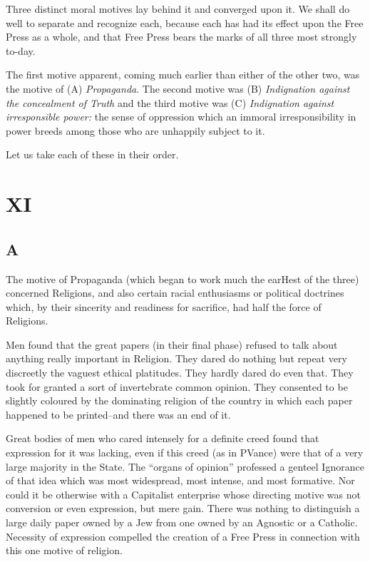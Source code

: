 \documentclass{book}
\begin{document}
Three distinct moral motives lay behind it and converged upon it. We shall do well to separate and recognize each, because each has had its effect upon the Free Press as a whole, and that Free Press bears the marks of all three most strongly to-day.

The first motive apparent, coming much earlier than either of the other two, was the motive of (A) \emph{Propaganda}. The second motive was (B) \emph{Indignation against the concealment of Truth} and the third motive was (C) \emph{Indignation against irresponsible power:} the sense of oppression which an immoral irresponsibility in power breeds among those who are unhappily subject to it.

Let us take each of these in their order.

\chapter*{XI}
\label{chapter-12}
\section*{A}
The motive of Propaganda (which began to work much the earHest of the three) concerned Religions, and also certain racial enthusiasms or political doctrines which, by their sincerity and readiness for sacrifice, had half the force of Religions.

Men found that the great papers (in their final phase) refused to talk about anything really important in Religion. They dared do nothing but repeat very discreetly the vaguest ethical platitudes. They hardly dared do even that. They took for granted a sort of invertebrate common opinion. They consented to be slightly coloured by the dominating religion of the country in which each paper happened to be printed–and there was an end of it.

Great bodies of men who cared intensely for a definite creed found that expression for it was lacking, even if this creed (as in PVance) were that of a very large majority in the State. The “organs of opinion” professed a genteel Ignorance of that idea which was most widespread, most intense, and most formative. Nor could it be otherwise with a Capitalist enterprise whose directing motive was not conversion or even expression, but mere gain. There was nothing to distinguish a large daily paper owned by a Jew from one owned by an Agnostic or a Catholic. Necessity of expression compelled the creation of a Free Press in connection with this one motive of religion.
\end{document}
